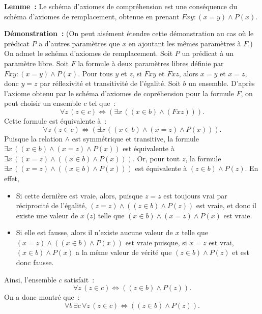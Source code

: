 \medskip

\noindent\textbf{Lemme :} Le schéma d'axiomes de compréhension est une conséquence du schéma d'axiomes de remplacement, obtenue en prenant $F x y : (x = y) \wedge P(x)$. 

\medskip

\noindent\textbf{Démonstration :} 
    (On peut aisément étendre cette démonstration au cas où le prédicat $P$ a d'autres paramètres que $x$ en ajoutant les mêmes paramètres à $F$.)
    On admet le schéma d'axiomes de remplacement. 
    Soit $P$ un prédicat à un paramètre libre. 
    Soit $F$ la formule à deux paramètres libres définie par $F x y : (x = y) \wedge P(x)$. 
    Pour tous $y$ et $z$, si $F x y$ et $F x z$, alors $x = y$ et $x = z$, donc $y = z$ par réflexivité et transitivité de l'égalité.
    Soit $b$ un ensemble. 
    D'après l'axiome obtenu par le schéma d'axiomes de copréhension pour la formule $F$, on peut choisir un ensemble $c$ tel que : 
    \begin{equation*}
        \forall z \, (z \in c) \Leftrightarrow \left( \exists x \, ((x \in b) \wedge (F x z)) \right). 
    \end{equation*}
    Cette formule est équivalente à : 
    \begin{equation*}
        \forall z \, (z \in c) \Leftrightarrow \left( \exists x \, ((x \in b) \wedge (x = z) \wedge P(x)) \right). 
    \end{equation*}
    Puisque la relation $\wedge$ est symmétrique et transitive, la formule $\exists x \, ((x \in b) \wedge (x = z) \wedge P(x))$ est équivalente à $\exists x \, ((x = z) \wedge  ((x \in b) \wedge P(x)))$.
    Or, pour tout $z$, la formule $\exists x \, ((x = z) \wedge ((x \in b) \wedge P(x)))$ est équivalente à $(z \in b) \wedge P(z)$.
    En effet, 
    \begin{itemize}[nosep]
        \item Si cette dernière est vraie, alors, puisque $z = z$ est toujours vrai par réciprocité de l'égalité, $(z = z) \wedge ((z \in b) \wedge P(z))$ est vraie, et donc il existe une valeur de $x$ ($z$) telle que $(x \in b) \wedge (x = z) \wedge P(x)$ est vraie. 
        \item Si elle est fausse, alors il n'existe aucune valeur de $x$ telle que $(x = z) \wedge ((x \in b) \wedge P(x))$ est vraie puisque, si $x = z$ est vrai, $(x \in b) \wedge P(x)$ a la même valeur de vérité que $(z \in b) \wedge P(z)$ et est donc fausse.
    \end{itemize}
    Ainsi, l'ensemble $c$ satisfait : 
    \begin{equation*}
        \forall z \, (z \in c) \Leftrightarrow \left( (z \in b) \wedge P(z) \right). 
    \end{equation*}
    On a donc montré que :
    \begin{equation*}
        \forall b \, \exists c \, \forall z \, (z \in c) \Leftrightarrow \left( (z \in b) \wedge P(z) \right). 
    \end{equation*}

